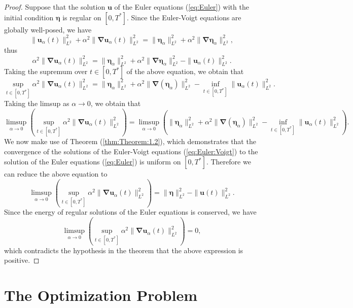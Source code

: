 \documentclass[12pt]{article}
\def\u{\boldsymbol u}
\def\ua{\boldsymbol u_\alpha}
\def\bn{\boldsymbol \nabla}
\def\be{\boldsymbol \eta}
\def\bea{\boldsymbol \eta_\alpha}
\numberwithin{equation}{section}
\begin{document}
\begin{proof}
Suppose that the solution $\u$ of the Euler equations (\ref{eq:Euler}) with the initial condition $\be$ is regular on $[0,T^*]$. Since the Euler-Voigt equations are globally well-posed, we have
\begin{equation}
\|\ua(t)\|_{L^2}^2 + \alpha^2\|\bn\ua(t)\|_{L^2}^2  = \|\bea\|_{L^2}^2+\alpha^2\|\bn\bea\|_{L^2}^2,
\end{equation}
thus
\begin{equation}
\alpha^2\|\bn\ua(t)\|_{L^2}^2  = \|\bea\|_{L^2}^2+\alpha^2\|\bn\bea\|_{L^2}^2 - \|\ua(t)\|_{L^2}^2.
\end{equation}
Taking the supremum over $t\in[0,T^*]$ of the above equation, we obtain that
\begin{equation}
\sup_{t\in[0,T^*]}\alpha^2\|\bn\ua(t)\|_{L^2}^2  = \|\bea\|_{L^2}^2+\alpha^2\|\bn(\bea)\|_{L^2}^2 - \inf_{t\in[0,T^*]} \|\ua(t)\|_{L^2}^2.
\end{equation}
Taking the limsup as $\alpha\rightarrow 0$, we obtain that
\begin{equation}
\limsup_{\alpha\rightarrow 0}\left(\sup_{t\in[0,T^*]}\alpha^2\|\bn\ua(t)\|_{L^2}^2\right)  = \limsup_{\alpha\rightarrow 0}\left(\|\bea\|_{L^2}^2+\alpha^2\|\bn(\bea)\|_{L^2}^2 - \inf_{t\in[0,T^*]} \|\ua(t)\|_{L^2}^2\right).
\end{equation}
We now make use of Theorem (\ref{thm:Theorem:1.2}), which demonstrates that the convergence of the solutions of the Euler-Voigt equations (\ref{eq:Euler:Voigt}) to the solution of the Euler equations (\ref{eq:Euler}) is uniform on $[0,T^*]$. Therefore we can reduce the above equation to
\begin{equation}
\limsup_{\alpha\rightarrow 0}\left(\sup_{t\in[0,T^*]}\alpha^2\|\bn\ua(t)\|_{L^2}^2\right)  = \|\be\|_{L^2}^2 - \|\u(t)\|_{L^2}^2.
\end{equation}
Since the energy of regular solutions of the Euler equations is conserved, we have
\begin{equation}
\limsup_{\alpha\rightarrow 0}\left(\sup_{t\in[0,T^*]}\alpha^2\|\bn\ua(t)\|_{L^2}^2\right)  = 0,
\end{equation}
which contradicts the hypothesis in the theorem that the above expression is positive.
\end{proof}

\section{The Optimization Problem}
\end{document}
